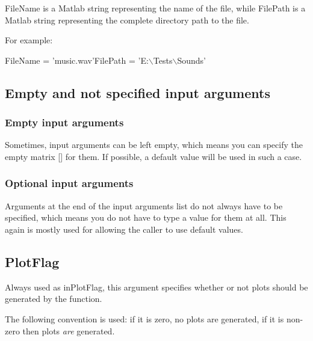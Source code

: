 FileName is a Matlab string representing the name of the file,
while FilePath is a Matlab string representing the complete
directory path to the file.

For example: \newline
\begin{IPEMCodeEnvironment}
FileName = 'music.wav'\newline FilePath =
'E:$\backslash$Tests$\backslash$Sounds'
\end{IPEMCodeEnvironment}


\subsection{Empty and not specified input arguments}

\subsubsection*{Empty input arguments}
Sometimes, input arguments can be left empty, which means you can
specify the empty matrix [] for them. If possible, a default value
will be used in such a case.

\subsubsection*{Optional input arguments}
Arguments at the end of the input arguments list do not always
have to be specified, which means you do not have to type a value
for them at all. This again is mostly used for allowing the
caller to use default values.


\subsection{PlotFlag}
Always used as inPlotFlag, this argument specifies whether or not
plots should be generated by the function.

The following convention is used: if it is zero, no plots are
generated, if it is non-zero then plots \textsl{are} generated.
